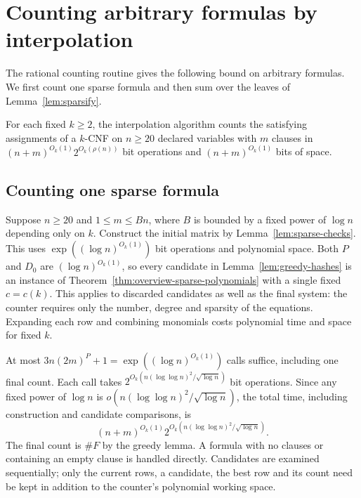 \section{Counting arbitrary formulas by interpolation}\label{sec:interpolation-return}
The rational counting routine gives the following bound on arbitrary
formulas. We first count one sparse formula and then sum over the
leaves of Lemma~\ref{lem:sparsify}.

\begin{proposition}\label{prop:interpolation-bound}
For each fixed $k\ge2$, the interpolation algorithm counts the
satisfying assignments of a $k$-CNF on $n\ge20$ declared variables
with $m$ clauses in $(n+m)^{O_k(1)}2^{O_k(\rho(n))}$ bit operations
and $(n+m)^{O_k(1)}$ bits of space.
\end{proposition}

\subsection{Counting one sparse formula}\label{subsec:count-sparse}
Suppose $n\ge20$ and $1\le m\le Bn$, where $B$ is bounded by a fixed
power of $\log n$ depending only on $k$. Construct the initial matrix
by Lemma~\ref{lem:sparse-checks}. This uses
$\exp((\log n)^{O_k(1)})$ bit operations and polynomial space.
Both $P$ and $D_0$ are $(\log n)^{O_k(1)}$, so every candidate in
Lemma~\ref{lem:greedy-hashes} is an instance of
Theorem~\ref{thm:overview-sparse-polynomials} with a single fixed
$c=c(k)$. This applies to discarded candidates as well as the final
system: the counter requires only the number, degree and sparsity of
the equations. Expanding each row and combining monomials costs
polynomial time and space for fixed $k$.

At most $3n(2m)^P+1=\exp((\log n)^{O_k(1)})$ calls suffice, including
one final count. Each call takes
$2^{O_k(n(\log\log n)^2/\sqrt{\log n})}$ bit operations. Since any
fixed power of $\log n$ is $o(n(\log\log n)^2/\sqrt{\log n})$, the
total time, including construction and candidate comparisons, is
\begin{equation}\label{eq:sparse-formula-cost}
 (n+m)^{O_k(1)}2^{O_k(n(\log\log n)^2/\sqrt{\log n})}.
\end{equation}
The final count is $\#F$ by the greedy lemma. A formula with no clauses
or containing an empty clause is handled directly. Candidates are
examined sequentially; only the current rows, a candidate, the best
row and its count need be kept in addition to the counter's polynomial
working space.

